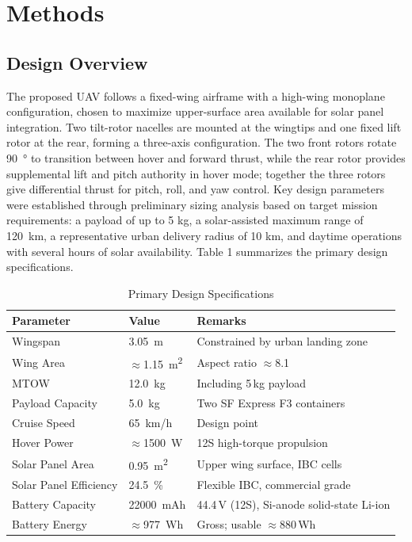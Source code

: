 \documentclass[conference]{IEEEtran}
\begin{document}
\section{Methods}
\subsection{Design Overview}
The proposed UAV follows a fixed-wing airframe with a high-wing monoplane configuration, chosen to maximize upper-surface area available for solar panel integration. Two tilt-rotor nacelles are mounted at the wingtips and one fixed lift rotor at the rear, forming a three-axis configuration. The two front rotors rotate \SI{90}{\degree} to transition between hover and forward thrust, while the rear rotor provides supplemental lift and pitch authority in hover mode; together the three rotors give differential thrust for pitch, roll, and yaw control.
Key design parameters were established through preliminary sizing analysis based on target mission requirements: a payload of up to 5 kg, a solar-assisted maximum range of \SI{120}{km}, a representative urban delivery radius of 10 km, and daytime operations with several hours of solar availability. Table 1 summarizes the primary design specifications.

\begin{table}[htbp]
\centering
\caption{Primary Design Specifications}
\label{tab:specs}
\renewcommand{\arraystretch}{1.3}
\begin{tabular}{lll}
\toprule
\textbf{Parameter} & \textbf{Value} & \textbf{Remarks} \\
\midrule
Wingspan              & \SI{3.05}{m}     & Constrained by urban landing zone \\
Wing Area             & $\approx$\SI{1.15}{m^2}  & Aspect ratio $\approx$8.1 \\
MTOW                  & \SI{12.0}{kg}    & Including 5\,kg payload \\
Payload Capacity      & \SI{5.0}{kg}     & Two SF Express F3 containers \\
Cruise Speed          & \SI{65}{km/h}    & Design point \\
Hover Power           & $\approx$\SI{1500}{W}    & 12S high-torque propulsion \\
Solar Panel Area      & \SI{0.95}{m^2}   & Upper wing surface, IBC cells \\
Solar Panel Efficiency& \SI{24.5}{\%}    & Flexible IBC, commercial grade \\
Battery Capacity      & \SI{22000}{mAh}  & 44.4\,V (12S), Si-anode solid-state Li-ion \\
Battery Energy        & $\approx$\SI{977}{Wh}    & Gross; usable $\approx$880\,Wh \\
\bottomrule
\end{tabular}
\end{table}
\end{document}
